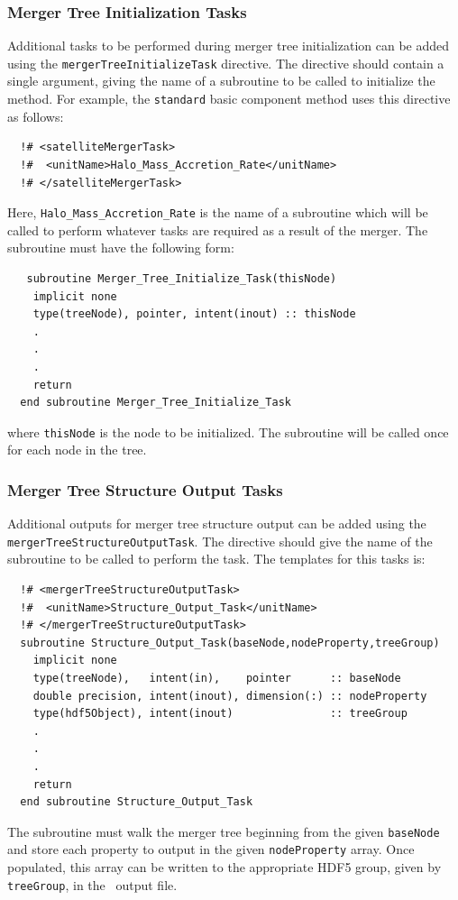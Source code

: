 \subsubsection{Merger Tree Initialization Tasks}

Additional tasks to be performed during merger tree initialization can be added using the {\tt mergerTreeInitializeTask} directive. The directive should contain a single argument, giving the name of a subroutine to be called to initialize the method. For example, the {\tt standard} basic component method uses this directive as follows:
\begin{verbatim}
  !# <satelliteMergerTask>
  !#  <unitName>Halo_Mass_Accretion_Rate</unitName>
  !# </satelliteMergerTask>
\end{verbatim}
Here, {\tt Halo\_Mass\_Accretion\_Rate} is the name of a subroutine which will be called to perform whatever tasks are required as a result of the merger. The subroutine must have the following form:
\begin{verbatim}
   subroutine Merger_Tree_Initialize_Task(thisNode)
    implicit none
    type(treeNode), pointer, intent(inout) :: thisNode
    .
    .
    .
    return
  end subroutine Merger_Tree_Initialize_Task
\end{verbatim}
where {\tt thisNode} is the node to be initialized. The subroutine will be called once for each node in the tree.

\subsubsection{Merger Tree Structure Output Tasks}

Additional outputs for merger tree structure output can be added using the {\tt mergerTreeStructureOutputTask}. The directive should give the name of the subroutine to be called to perform the task. The templates for this tasks is:
\begin{verbatim}
  !# <mergerTreeStructureOutputTask>
  !#  <unitName>Structure_Output_Task</unitName>
  !# </mergerTreeStructureOutputTask>
  subroutine Structure_Output_Task(baseNode,nodeProperty,treeGroup)
    implicit none
    type(treeNode),   intent(in),    pointer      :: baseNode
    double precision, intent(inout), dimension(:) :: nodeProperty
    type(hdf5Object), intent(inout)               :: treeGroup
    .
    .
    .
    return
  end subroutine Structure_Output_Task
\end{verbatim}
The subroutine must walk the merger tree beginning from the given {\tt baseNode} and store each property to output in the given {\tt nodeProperty} array. Once populated, this array can be written to the appropriate HDF5 group, given by {\tt treeGroup}, in the \glc\ output file.

